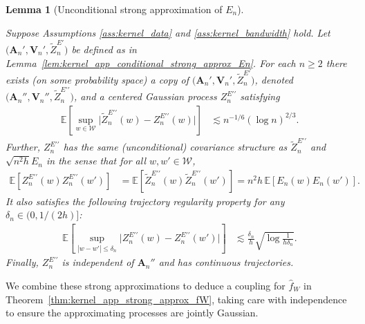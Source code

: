 \documentclass[11pt,lof]{puthesis}
\newcommand{\E}{\ensuremath{\mathbb{E}}}
\newcommand{\bA}{\ensuremath{\mathbf{A}}}
\newcommand{\bV}{\ensuremath{\mathbf{V}}}
\newcommand{\cW}{\ensuremath{\mathcal{W}}}
\newcommand{\dprime}{\ensuremath{\prime\prime}}
\theoremstyle{break}
\newtheorem{lemma}{Lemma}[section]
\theoremstyle{proof}
\begin{document}
\begin{lemma}[Unconditional strong approximation of $E_n$]
\label{lem:kernel_app_unconditional_strong_approx_En}

Suppose Assumptions
\ref{ass:kernel_data} and \ref{ass:kernel_bandwidth} hold.
Let $\big(\bA_n', \bV_n', \tilde Z_n^{E\prime}\big)$
be defined as in
Lemma~\ref{lem:kernel_app_conditional_strong_approx_En}.
For each $n \geq 2$
there exists
(on some probability space)
a copy of
$\big(\bA_n', \bV_n', \tilde Z_n^{E\prime}\big)$,
denoted
$\big(\bA_n'', \bV_n'', \tilde Z_n^{E\dprime}\big)$,
and a centered
Gaussian process
$Z^{E\dprime}_n$
satisfying
%
\begin{align*}
\E\left[
\sup_{w \in \cW}
\big|\tilde Z_n^{E\dprime}(w) - Z_n^{E\dprime}(w)\big|
\right]
&\lesssim
n^{-1/6} (\log n)^{2/3}.
\end{align*}
%
Further,
$Z_n^{E\dprime}$ has the same
(unconditional) covariance structure as
$\tilde Z_n^{E\dprime}$ and $\sqrt{n^2h} E_n$
in the sense that for all $w, w' \in \cW$,
%
\begin{align*}
\E\left[
Z_n^{E\dprime}(w)
Z_n^{E\dprime}(w')
\right]
&=
\E\left[
\tilde Z_n^{E\dprime}(w)
\tilde Z_n^{E\dprime}(w')
\right]
=
n^2h \,
\E\left[
E_n(w)
E_n(w')
\right].
\end{align*}
%
It also satisfies the following
trajectory regularity property
for any $\delta_n \in (0, 1/(2h)]$:
%
\begin{align*}
\E\left[
\sup_{|w-w'| \leq \delta_n}
\big|
Z_n^{E\dprime}(w)
- Z_n^{E\dprime}(w')
\big|
\right]
&\lesssim
\frac{\delta_n}{h}
\sqrt{\log \frac{1}{h\delta_n}}.
\end{align*}
%
Finally, $Z_n^{E\dprime}$ is independent of $\bA_n''$
and has continuous trajectories.

\end{lemma}

We combine these strong approximations to deduce a coupling for $\hat f_W$ in
Theorem~\ref{thm:kernel_app_strong_approx_fW}, taking care with independence
to ensure the approximating processes are jointly Gaussian.
\end{document}
